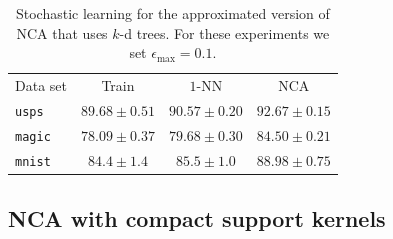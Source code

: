 \begin{table}
  \centering
 	\begin{tabular}{lccc}
 	\toprule
 	Data set & Train & $1$-NN & NCA \\
 	\cmidrule(r){2-2}\cmidrule(r){3-4}
 	\texttt{usps}&$89.68 \pm 0.51$&$90.57 \pm 0.20$&$92.67 \pm 0.15$\\
\texttt{magic}&$78.09 \pm 0.37$&$79.68 \pm 0.30$&$84.50 \pm 0.21$\\
\texttt{mnist}&$84.4 \pm 1.4$&$85.5 \pm 1.0$&$88.98 \pm 0.75$\\
  \bottomrule
  \end{tabular}
  \caption[Accuracy for the  approximated version of NCA trained using stochastic learning on large data sets]{Stochastic learning for the approximated version of NCA that uses $k$-d trees. For these experiments we set $\epsilon_{\max}=0.1$.}
  \label{tab:nca-sl-k-d-trees}
\end{table}

\subsection{NCA with compact support kernels}
\label{subsec:eval-nca-cs}

